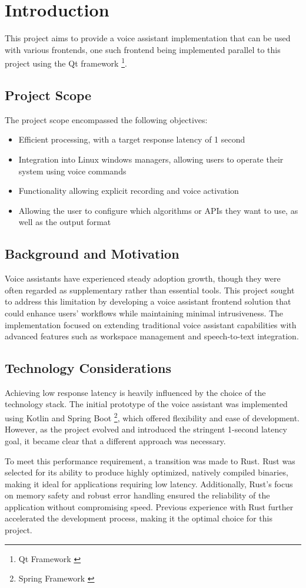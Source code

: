 \renewcommand*\chapterpagestyle{scrheadings}
\chapter{Introduction}

This project aims to provide a voice assistant implementation that can be used with various frontends,
one such frontend being implemented parallel to this project using the Qt framework \footnote{Qt Framework \cite{qt}}.

\section{Project Scope}
The project scope encompassed the following objectives:
\begin{itemize}
    \item Efficient processing, with a target response latency of 1 second
    \item Integration into Linux windows managers, allowing users to operate their system using voice commands
    \item Functionality allowing explicit recording and voice activation
    \item Allowing the user to configure which algorithms or APIs they want to use, as well as the output format
\end{itemize}

\section{Background and Motivation}
Voice assistants have experienced steady adoption growth,
though they were often regarded as supplementary rather than essential tools.
This project sought to address this limitation
by developing a voice assistant frontend solution that could enhance users' workflows
while maintaining minimal intrusiveness.
The implementation focused on extending traditional voice assistant capabilities
with advanced features such as workspace management and speech-to-text integration.

\section{Technology Considerations}
Achieving low response latency is heavily influenced by the choice of the technology stack.
The initial prototype of the voice assistant was implemented using Kotlin and Spring Boot
\footnote{Spring Framework \cite{spring}}, which offered flexibility and ease of development.
However, as the project evolved and introduced the stringent 1-second latency goal,
it became clear that a different approach was necessary.

To meet this performance requirement, a transition was made to Rust.
Rust was selected for its ability to produce highly optimized,
natively compiled binaries, making it ideal for applications requiring low latency.
Additionally, Rust's focus on memory safety and robust error handling
ensured the reliability of the application without compromising speed.
Previous experience with Rust further accelerated the development process,
making it the optimal choice for this project.

